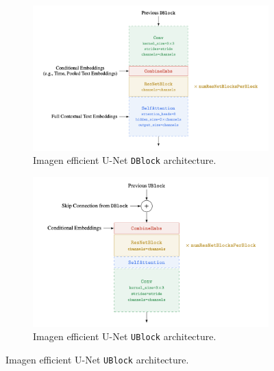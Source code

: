 \begin{figure}
    \centering
    \begin{subfigure}[b]{0.5\textwidth}   
        \centering 
        \includegraphics[width=\textwidth]{images/appendix/imagen/dblock.png}
        \caption[]%
        {{\small Imagen efficient U-Net \texttt{DBlock} architecture.}}
    \end{subfigure}
    \hfill
    \begin{subfigure}[b]{0.475\textwidth}
        \centering
        \includegraphics[width=\textwidth]{images/appendix/imagen/ublock.png}
        \caption[]%
        {{\small Imagen efficient U-Net \texttt{UBlock} architecture.}}
    \end{subfigure}
\end{figure}


